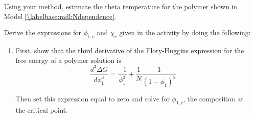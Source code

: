 \begin{activity}
\begin{ctqs}
	\question Using your method, estimate the theta temperature for the polymer shown in Model \ref{\labelbase:mdl:Ndependence}.
	
		\begin{solution}[0.5in]\end{solution} 

\end{ctqs}



\begin{exercises}

	\exercise Derive the expressions for $\phi_{1,c}$ and $\chi_c$ given in the activity by doing the following:
		\label{\labelbase:exc:critpt}
	
		\begin{enumerate}
	
			\item First, show that the third derivative of the Flory-Huggins expression for the free energy of a polymer solution is
				\begin{equation*}
					\frac{d^3\Delta G}{d\phi_1^3} = \frac{-1}{\phi_1^2} + \frac{1}{N}\frac{1}{(1-\phi_1)^2}
				\end{equation*}
		
				Then set this expression equal to zero and solve for $\phi_{1,c}$, the composition at the critical point.
			

\end{enumerate}
\end{exercises}
\end{activity}
